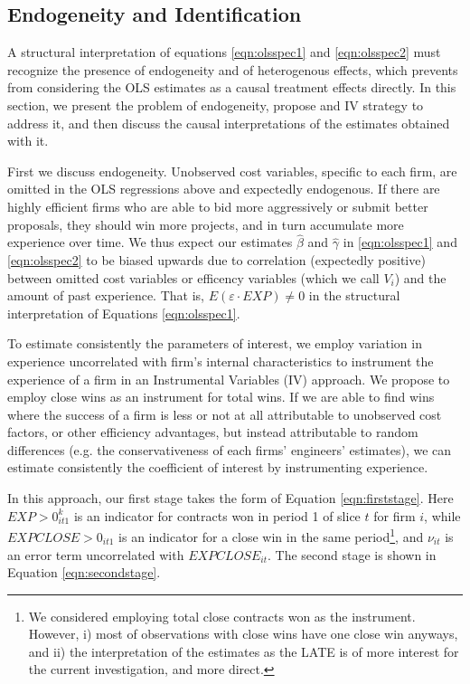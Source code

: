 \subsection{Endogeneity and Identification}
A structural interpretation of equations \ref{eqn:olsspec1} and \ref{eqn:olsspec2} must recognize the presence of endogeneity and of heterogenous effects, which prevents from considering the OLS estimates as a causal treatment effects directly. In this section, we present the problem of endogeneity, propose and IV strategy to address it, and then discuss the causal interpretations of the estimates obtained with it.

First we discuss endogeneity. Unobserved cost variables, specific to each firm, are omitted in the OLS regressions above and expectedly endogenous. If there are highly efficient firms who are able to bid more aggressively or submit better proposals, they should win more projects, and in turn accumulate more experience over time. We thus expect our estimates $\hat{\beta}$ and $\hat{\gamma}$ in \ref{eqn:olsspec1} and \ref{eqn:olsspec2} to be biased upwards due to correlation (expectedly positive) between omitted cost variables or efficency variables (which we call $V_i$) and the amount of past experience. That is, $E(\varepsilon \cdot EXP)\neq 0$ in the structural interpretation of Equations \ref{eqn:olsspec1}.

To estimate consistently the parameters of interest, we employ variation in experience uncorrelated with firm's internal characteristics to instrument the experience of a firm in an Instrumental Variables (IV) approach. We propose to employ close wins as an instrument for total wins. If we are able to find wins where the success of a firm is less or not at all attributable to unobserved cost factors, or other efficiency advantages, but instead attributable to random differences (e.g. the conservativeness of each firms' engineers' estimates), we can estimate consistently the coefficient of interest by instrumenting experience.

In this approach, our first stage takes the form of Equation \ref{eqn:firststage}. Here $EXP>0_{it1}^k$ is an indicator for contracts won in period 1 of slice $t$ for firm $i$, while $EXPCLOSE>0_{it1}$ is an indicator for a close win in the same period\footnote{We considered employing total close contracts won as the instrument. However, i) most of observations with close wins have one close win anyways, and ii) the interpretation of the estimates as the LATE is of more interest for the current investigation,  and more direct.}, and $\nu_{it}$ is an error term uncorrelated with $EXPCLOSE_{it}$. The second stage is shown in Equation \ref{eqn:secondstage}.

